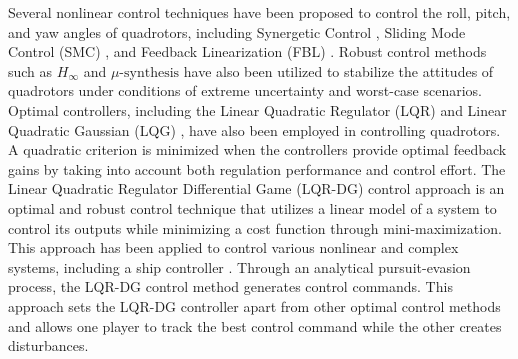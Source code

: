 \documentclass[3p,times]{elsarticle}
\begin{document}
Several nonlinear control techniques have been proposed to control the roll, pitch, and yaw angles of quadrotors,
including
Synergetic Control \cite{article_Chara}, 
Sliding Mode Control (SMC) \cite{7007285},
and Feedback Linearization (FBL) \cite{article_Aboudonia}.
Robust control methods such as $H_{\infty}$ \cite{9283788, inproceedings_Hamza} and $\mu\text{-synthesis}$ \cite{inbook_Dean} have also been utilized to stabilize the attitudes of quadrotors under conditions of extreme uncertainty and worst-case scenarios.
Optimal controllers, including the Linear Quadratic Regulator (LQR) \cite{7064553_LQR} and Linear Quadratic Gaussian (LQG) \cite{7367782}, have also been employed in controlling quadrotors. A quadratic criterion is minimized when the controllers provide optimal feedback gains by taking into account both regulation performance and control
effort.
The Linear Quadratic Regulator Differential Game (LQR-DG) control approach \cite{LQDG, article_Engwerda_min_max} is an optimal and robust control technique that utilizes a linear model of a system to control its outputs while minimizing a cost function through mini-maximization. This approach has been applied to control various nonlinear and complex systems, including a ship controller \cite{6957349, 6160768}.
Through an analytical pursuit-evasion process, the LQR-DG control method generates control commands.
This approach sets the LQR-DG controller apart from other optimal control methods and allows one player to track the best control command while the other creates disturbances.
\end{document}

